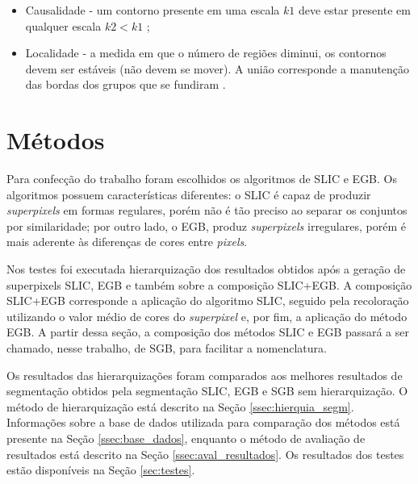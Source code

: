 \begin{document}
\begin{itemize}
 \item Causalidade - um contorno presente em uma escala $k1$ deve estar presente em qualquer escala $k2 < k1$ \cite{SILVIO_ZENILTON};
 \item Localidade - a medida em que o número de regiões diminui, os contornos devem ser estáveis (não devem se mover). A união corresponde a manutenção das bordas dos grupos que se fundiram \cite{SILVIO_ZENILTON}.
\end{itemize}


\section{Métodos} \label{sec:mat_metodos}

Para confecção do trabalho foram escolhidos os algoritmos de SLIC e EGB. Os algoritmos possuem características diferentes: o SLIC é capaz de produzir \textit{superpixels} em formas regulares, porém não é tão preciso ao separar os conjuntos por similaridade; por outro lado, o EGB, produz \textit{superpixels} irregulares, porém é mais aderente às diferenças de cores entre \textit{pixels}.

Nos testes foi executada hierarquização dos resultados obtidos após a geração de superpixels SLIC, EGB e também sobre a composição SLIC+EGB. A composição SLIC+EGB corresponde a aplicação do algoritmo SLIC, seguido pela recoloração utilizando o valor médio de cores do \textit{superpixel} e, por fim, a aplicação do método EGB. A partir dessa seção, a composição dos métodos SLIC e EGB passará a ser chamado, nesse trabalho, de SGB, para facilitar a nomenclatura.

Os resultados das hierarquizações foram comparados aos melhores resultados de segmentação obtidos pela segmentação SLIC, EGB e SGB sem hierarquização. O método de hierarquização está descrito na Seção \ref{ssec:hierquia_segm}. Informações sobre a base de dados utilizada para comparação dos métodos está presente na Seção \ref{ssec:base_dados}, enquanto o método de avaliação de resultados está descrito na Seção \ref{ssec:aval_resultados}. Os resultados dos testes estão disponíveis na Seção \ref{sec:testes}.

\end{document}
